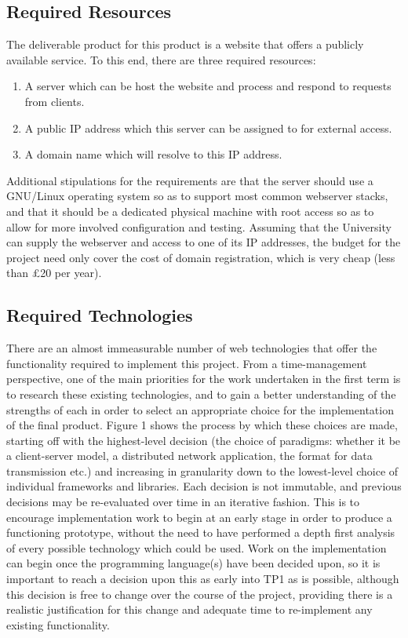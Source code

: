 \documentclass[12pt,a4paper]{article}
\begin{document}
\subsection{Required Resources}
The deliverable product for this product is a website that offers a publicly
available service. To this end, there are three required resources:

\begin{enumerate}
\item A server which can be host the website and process and respond to requests
  from clients.
\item A public IP address which this server can be assigned to for external
  access.
\item A domain name which will resolve to this IP address.
\end{enumerate}

Additional stipulations for the requirements are that the server should use a
GNU/Linux operating system so as to support most common webserver stacks, and
that it should be a dedicated physical machine with root access so as to allow
for more involved configuration and testing. Assuming that the University can
supply the webserver and access to one of its IP addresses, the budget for the
project need only cover the cost of domain registration, which is very cheap
(less than £20 per year).

\subsection{Required Technologies}
There are an almost immeasurable number of web technologies that offer the
functionality required to implement this project. From a time-management
perspective, one of the main priorities for the work undertaken in the first
term is to research these existing technologies, and to gain a better
understanding of the strengths of each in order to select an appropriate choice
for the implementation of the final product. Figure 1 shows the process by which
these choices are made, starting off with the highest-level decision (the choice
of paradigms: whether it be a client-server model, a distributed network
application, the format for data transmission etc.) and increasing in
granularity down to the lowest-level choice of individual frameworks and
libraries. Each decision is not immutable, and previous decisions may be
re-evaluated over time in an iterative fashion. This is to encourage
implementation work to begin at an early stage in order to produce a functioning
prototype, without the need to have performed a depth first analysis of every
possible technology which could be used. Work on the implementation can begin
once the programming language(s) have been decided upon, so it is important to
reach a decision upon this as early into TP1 as is possible, although this
decision is free to change over the course of the project, providing there is a
realistic justification for this change and adequate time to re-implement any
existing functionality.
\end{document}
